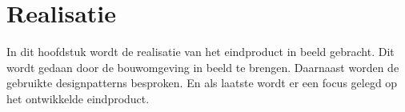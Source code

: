 \chapter{Realisatie}
In dit hoofdstuk wordt de realisatie van het eindproduct in beeld gebracht.
Dit wordt gedaan door de bouwomgeving in beeld te brengen.
Daarnaast worden de gebruikte designpatterns besproken.
En als laatste wordt er een focus gelegd op het ontwikkelde eindproduct.




